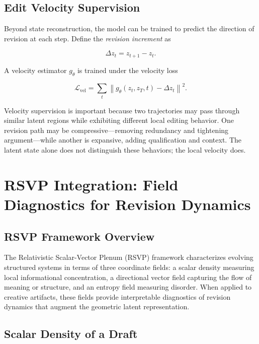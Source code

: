 \documentclass[12pt,a4paper]{article}
\theoremstyle{draftthm}
\newcommand{\norm}[1]{\left\|#1\right\|}
\newcommand{\dz}{\Delta z}
\begin{document}
\subsection{Edit Velocity Supervision}

Beyond state reconstruction, the model can be trained to predict the direction of revision at each step. Define the \emph{revision increment} as

\begin{equation}
  \dz_t = z_{t+1} - z_t.
\end{equation}

A velocity estimator $g_{\theta}$ is trained under the velocity loss

\begin{equation}
  \mathcal{L}_{\mathrm{vel}}
  =
  \sum_t
  \norm{g_{\theta}(z_t, z_T, t) - \dz_t}^2.
  \label{eq:velocity-loss}
\end{equation}

Velocity supervision is important because two trajectories may pass through similar latent regions while exhibiting different local editing behavior. One revision path may be compressive---removing redundancy and tightening argument---while another is expansive, adding qualification and context. The latent state alone does not distinguish these behaviors; the local velocity does.

\section{RSVP Integration: Field Diagnostics for Revision Dynamics}

\subsection{RSVP Framework Overview}

The Relativistic Scalar-Vector Plenum (RSVP) framework characterizes evolving structured systems in terms of three coordinate fields: a scalar density measuring local informational concentration, a directional vector field capturing the flow of meaning or structure, and an entropy field measuring disorder. When applied to creative artifacts, these fields provide interpretable diagnostics of revision dynamics that augment the geometric latent representation.

\subsection{Scalar Density of a Draft}
\end{document}
